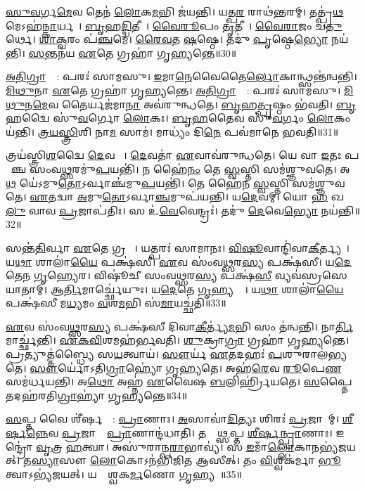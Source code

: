 \ul{𑌸𑍁}\ul{𑌵}𑌰𑍍𑌗\ul{𑌮𑍇}𑌵 𑌤𑍇𑌨॑ \ul{𑌲𑍋}𑌕\ul{𑌮}𑌭𑌿 𑌜॑𑌯𑌨𑍍𑌤𑌿।
𑌯𑌤𑍍𑌪\ul{𑌰}\ul{} 𑌰𑌾𑌥॑𑌨𑍍𑌤𑌰𑌮𑍍।
𑌤𑌤𑍍𑌪𑍍𑌰॑\ul{𑌥}𑌮𑍇\-𑌽𑌹॑\ul{𑌨𑍍𑌕𑌾}𑌰𑍍𑌯𑌮𑍍᳚।
\ul{𑌬𑍃}𑌹\ul{𑌦𑍍𑌦𑍍𑌵𑌿}𑌤𑍀𑌯𑍇᳚।
\ul{𑌵𑍈}\ul{𑌰𑍂}𑌪𑌂 \ul{𑌤𑍃}𑌤𑍀𑌯𑍇᳚।
\ul{𑌵𑍈}\ul{𑌰𑌾}𑌜𑌂 𑌚॑\ul{𑌤𑍁}𑌰𑍍𑌥𑍇।
\ul{𑌶𑌾}\ul{𑌕𑍍𑌵}𑌰𑌂 𑌪॑\ul{𑌞𑍍𑌚}𑌮𑍇।
\ul{𑌰𑍈}\ul{𑌵}𑌤 \ul{𑌷}𑌷𑍍𑌠𑍇।
𑌤𑌦𑍁॑ \ul{𑌪𑍃}𑌷𑍍𑌠𑍇\ul{𑌭𑍍𑌯𑍋} 𑌨𑌯॑𑌨𑍍𑌤𑌿।
\ul{𑌸}𑌨𑍍𑌤𑌨॑𑌯 \ul{𑌏}𑌤𑍇 𑌗𑍍𑌰𑌹𑌾॑ 𑌗𑍃𑌹𑍍𑌯𑌨𑍍𑌤𑍇॥30॥

\ul{𑌅}\ul{𑌤𑌿}\ul{𑌗𑍍𑌰𑌾}𑌹𑍍𑌯𑌾᳚: 𑌪𑌰𑌃॑ 𑌸𑌾𑌮𑌸𑍁।
\ul{𑌇}𑌮𑌾\ul{𑌨𑍇}𑌵𑍈𑌤𑍈\ul{𑌰𑍍𑌲𑍋}𑌕𑌾𑌨𑍍𑌥𑍍𑌸𑌨𑍍𑌤॑𑌨𑍍𑌵𑌨𑍍𑌤𑌿।
\ul{𑌮𑌿}\ul{𑌥𑍁}𑌨𑌾 \ul{𑌏}𑌤𑍇 𑌗𑍍𑌰𑌹𑌾॑ 𑌗𑍃𑌹𑍍𑌯𑌨𑍍𑌤𑍇।
\ul{𑌅}\ul{𑌤𑌿}\ul{𑌗𑍍𑌰𑌾}𑌹𑍍𑌯𑌾᳚: 𑌪𑌰𑌃॑ 𑌸𑌾𑌮𑌸𑍁।
\ul{𑌮𑌿}\ul{𑌥𑍁}𑌨\ul{𑌮𑍇}𑌵 𑌤𑍈𑌰𑍍𑌯𑌜॑𑌮𑌾\ul{𑌨𑌾} 𑌅𑌵॑𑌰𑍁𑌨𑍍𑌧𑌤𑍇।
\ul{𑌬𑍃}𑌹\ul{𑌤𑍍𑌪𑍃}𑌷𑍍𑌠𑌂 𑌭॑𑌵𑌤𑌿।
\ul{𑌬𑍃}𑌹𑌦𑍍𑌵𑍈 𑌸𑍁॑\ul{𑌵}𑌰𑍍𑌗𑍋 \ul{𑌲𑍋}𑌕𑌃।
\ul{𑌬𑍃}\ul{𑌹}𑌤𑍈𑌵 𑌸𑍁॑\ul{𑌵}𑌰𑍍𑌗𑌂 \ul{𑌲𑍋}𑌕𑌂 𑌯॑𑌨𑍍𑌤𑌿।
\ul{𑌤𑍍𑌰}\ul{𑌯}\ul{𑌸𑍍𑌤𑍍𑌰𑌿}\ul{}𑌶𑌿  𑌨𑌾\ul{𑌮} 𑌸𑌾𑌮॑।
𑌮𑌾𑌧𑍍𑌯𑌂॑ 𑌦𑌿\ul{𑌨𑍇} 𑌪𑌵॑𑌮𑌾𑌨𑍇 𑌭𑌵𑌤𑌿॥31॥

𑌤𑍍𑌰𑌯॑𑌸𑍍𑌤𑍍𑌰𑌿\ul{𑌶}𑌦𑍍𑌵𑍈 \ul{𑌦𑍇}𑌵𑌤𑌾𑌃᳚।
\ul{𑌦𑍇}𑌵𑌤𑌾॑ \ul{𑌏}𑌵𑌾𑌵॑𑌰𑍁𑌨𑍍𑌧𑌤𑍇।
𑌯𑍇 𑌵𑌾 \ul{𑌇}𑌤𑌃 𑌪𑌰𑌾᳚𑌞𑍍𑌚 𑌸𑌂𑌵\ul{𑌥𑍍𑌸}𑌰𑌮𑍁॑\ul{𑌪}𑌯𑌨𑍍𑌤𑌿॑।
𑌨 𑌹𑍈॑\ul{𑌨𑌂} 𑌤𑍇 \ul{𑌸𑍍𑌵}𑌸𑍍𑌤𑌿 𑌸𑌮॑𑌶𑍍𑌞𑍁𑌵𑌤𑍇।
𑌅\ul{𑌥} 𑌯𑍇॑\-𑌽𑌮𑍁\ul{𑌤𑍋}\-𑌽𑌰𑍍𑌵𑌾𑌞𑍍𑌚॑𑌮𑍁\ul{𑌪}𑌯𑌨𑍍𑌤𑌿॑।
𑌤𑍇 𑌹𑍈॑𑌨 \ul{𑌸𑍍𑌵}𑌸𑍍𑌤𑌿 𑌸𑌮॑𑌶𑍍𑌞𑍁𑌵𑌤𑍇।
\ul{𑌏}𑌤𑌦𑍍𑌵𑌾 \ul{𑌅}𑌮𑍁\ul{𑌤𑍋}\-𑌽𑌰𑍍𑌵𑌾\ul{𑌞𑍍𑌚}𑌮𑍁𑌪॑𑌯𑌨𑍍𑌤𑌿।
𑌯\ul{𑌦𑍇}𑌵𑌮𑍍।
𑌯𑍋 \ul{𑌹} 𑌖\ul{𑌲𑍁} 𑌵𑌾𑌵 \ul{𑌪𑍍𑌰}𑌜𑌾𑌪॑𑌤𑌿𑌃।
𑌸 𑌉॑\ul{𑌵𑍇}𑌵𑍇𑌨𑍍𑌦𑍍𑌰𑌃॑।
𑌤𑌦𑍁॑ \ul{𑌦𑍇}𑌵𑍇\ul{𑌭𑍍𑌯𑍋} 𑌨𑌯॑𑌨𑍍𑌤𑌿॥32॥\anuvakamend[\ul{𑌕𑌾}𑌰𑍍𑌯𑌾॑ \ul{𑌵𑌿}𑌰𑌾𑌡𑍍𑌗𑍃॑𑌹𑍍𑌯\ul{𑌨𑍍𑌤𑍇} 𑌪𑌵॑𑌮𑌾𑌨𑍇 𑌭\ul{𑌵}𑌤𑍀\ul{𑌨𑍍𑌦𑍍𑌰} 𑌏𑌕𑌂॑ 𑌚]

𑌸𑌨𑍍𑌤॑\ul{𑌤𑌿}𑌰𑍍𑌵𑌾 \ul{𑌏}𑌤𑍇 𑌗𑍍𑌰𑌹𑌾𑌃᳚।
𑌯𑌤𑍍𑌪𑌰𑌃॑ 𑌸𑌾𑌮𑌾𑌨𑌃।
\ul{𑌵𑌿}\ul{𑌷𑍂}𑌵𑌾𑌨𑍍𑌦𑌿॑𑌵𑌾\-\ul{𑌕𑍀}𑌰𑍍𑌤𑍍𑌯𑌮𑍍᳚।
𑌯\ul{𑌥𑌾} 𑌶𑌾𑌲𑌾॑\ul{𑌯𑍈} 𑌪𑌕𑍍𑌷॑𑌸𑍀।
\ul{𑌏}𑌵 𑌸𑌂॑𑌵\ul{𑌥𑍍𑌸}𑌰\ul{𑌸𑍍𑌯} 𑌪𑌕𑍍𑌷॑𑌸𑍀।
𑌯\ul{𑌦𑍇}𑌤𑍇𑌨 \ul{𑌗𑍃}𑌹𑍍𑌯𑍇𑌰\sn{}।
𑌵𑌿𑌷𑍂॑𑌚𑍀 𑌸𑌂𑌵\ul{𑌥𑍍𑌸}𑌰\ul{𑌸𑍍𑌯} 𑌪𑌕𑍍𑌷॑\ul{𑌸𑍀} 𑌵𑍍𑌯𑌵॑𑌸𑍍𑌰𑌸𑍇𑌯𑌾𑌤𑌾𑌮𑍍।
𑌆\ul{𑌰𑍍𑌤𑌿}𑌮𑌾𑌰𑍍𑌚𑍍𑌛𑍇॑𑌯𑍁𑌃।
𑌯\ul{𑌦𑍇}𑌤𑍇 \ul{𑌗𑍃}𑌹𑍍𑌯𑌨𑍍𑌤𑍇᳚।
𑌯\ul{𑌥𑌾} 𑌶𑌾𑌲𑌾॑\ul{𑌯𑍈} 𑌪𑌕𑍍𑌷॑𑌸𑍀 𑌮\ul{𑌧𑍍𑌯}𑌮𑌂 \ul{𑌵}\ul{}𑌶\ul{𑌮}𑌭𑌿 𑌸॑\ul{𑌮𑌾}𑌯𑌚𑍍𑌛॑𑌤𑌿॥33॥

\ul{𑌏}𑌵 𑌸𑌂॑𑌵\ul{𑌥𑍍𑌸}𑌰\ul{𑌸𑍍𑌯} 𑌪𑌕𑍍𑌷॑𑌸𑍀 𑌦𑌿𑌵𑌾\ul{𑌕𑍀}𑌰𑍍𑌤𑍍𑌯॑\ul{𑌮}𑌭𑌿 𑌸𑌂 𑌤॑𑌨𑍍𑌵𑌨𑍍𑌤𑌿।
𑌨𑌾\ul{𑌰𑍍𑌤𑌿}𑌮𑌾𑌰𑍍𑌚𑍍𑌛॑𑌨𑍍𑌤𑌿।
\ul{𑌏}\ul{𑌕}\ul{𑌵𑌿}\ul{}𑌶𑌮𑌹॑𑌰𑍍𑌭𑌵𑌤𑌿।
\ul{𑌶𑍁}𑌕𑍍𑌰𑌾\ul{𑌗𑍍𑌰𑌾} 𑌗𑍍𑌰𑌹𑌾॑ 𑌗𑍃𑌹𑍍𑌯𑌨𑍍𑌤𑍇।
𑌪𑍍𑌰𑌤𑍍𑌯𑍁𑌤𑍍𑌤॑𑌬𑍍𑌧𑍍𑌯𑍈 𑌸\ul{𑌯}𑌤𑍍𑌵𑌾𑌯॑।
\ul{𑌸𑍗}𑌰𑍍𑌯॑ \ul{𑌏}𑌤𑌦𑌹𑌃॑ \ul{𑌪}𑌶𑍁𑌰𑌾𑌲॑𑌭𑍍𑌯𑌤𑍇।
\ul{𑌸𑍗}𑌰𑍍𑌯𑍋॑\-𑌽𑌤𑌿\ul{𑌗𑍍𑌰𑌾}𑌹𑍍𑌯𑍋॑ 𑌗𑍃𑌹𑍍𑌯𑌤𑍇।
𑌅𑌹॑\ul{𑌰𑍇}𑌵 \ul{𑌰𑍂}𑌪𑍇\ul{𑌣} 𑌸𑌮॑𑌰𑍍𑌧𑌯𑌨𑍍𑌤𑌿।
𑌅\ul{𑌥𑍋} 𑌅𑌹𑍍𑌨॑ \ul{𑌏}𑌵𑍈𑌷 \ul{𑌬}𑌲𑌿𑌰𑍍\mbox{}𑌹𑍍𑌰𑌿॑𑌯𑌤𑍇।
\ul{𑌸}𑌪𑍍𑌤𑍈𑌤𑌦𑌹॑𑌰𑌤𑌿\ul{𑌗𑍍𑌰𑌾}𑌹𑍍𑌯𑌾॑ 𑌗𑍃𑌹𑍍𑌯𑌨𑍍𑌤𑍇॥34॥

\ul{𑌸}𑌪𑍍𑌤 𑌵𑍈 𑌶𑍀॑𑌰𑍍\mbox{}\ul{𑌷}𑌣𑍍𑌯𑌾᳚: \ul{𑌪𑍍𑌰𑌾}𑌣𑌾𑌃।
\ul{𑌅}𑌸𑌾𑌵𑌾॑\ul{𑌦𑌿}𑌤𑍍𑌯𑌃 𑌶𑌿𑌰𑌃॑ \ul{𑌪𑍍𑌰}𑌜𑌾𑌨𑌾᳚𑌮𑍍।
\ul{𑌶𑍀}\ul{𑌰𑍍}𑌷\ul{𑌨𑍍𑌨𑍇}𑌵 \ul{𑌪𑍍𑌰}𑌜𑌾𑌨𑌾𑌂᳚ \ul{𑌪𑍍𑌰𑌾}𑌣𑌾𑌨𑍍𑌦॑𑌧𑌾𑌤𑌿।
𑌤𑌸𑍍𑌮𑌾᳚\ul{𑌥𑍍𑌸}𑌪𑍍𑌤 \ul{𑌶𑍀}\ul{𑌰𑍍}𑌷\ul{𑌨𑍍𑌪𑍍𑌰𑌾}𑌣𑌾𑌃।
𑌇𑌨𑍍𑌦𑍍𑌰𑍋॑ \ul{𑌵𑍃}𑌤𑍍𑌰 \ul{𑌹}𑌤𑍍𑌵𑌾।
𑌅𑌸𑍁॑𑌰𑌾𑌨𑍍𑌪\ul{𑌰𑌾}𑌭𑌾𑌵𑍍𑌯॑।
𑌸 \ul{𑌇}𑌮𑌾𑌁\ul{𑌲𑍍𑌲𑍋}𑌕𑌾\ul{𑌨}𑌭𑍍𑌯॑𑌜𑌯𑌤𑍍।
𑌤\ul{𑌸𑍍𑌯𑌾}𑌸𑍗 \ul{𑌲𑍋}𑌕𑍋\-𑌽𑌨॑𑌭𑌿𑌜𑌿𑌤 𑌆𑌸𑍀𑌤𑍍।
𑌤𑌂 \ul{𑌵𑌿}𑌶𑍍𑌵𑌕॑𑌰𑍍𑌮𑌾 \ul{𑌭𑍂}𑌤𑍍𑌵𑌾\-𑌽𑌭𑍍𑌯॑𑌜𑌯𑌤𑍍।
𑌯𑌦𑍍𑌵𑍈᳚𑌶𑍍𑌵𑌕\ul{𑌰𑍍𑌮}𑌣𑍋 \ul{𑌗𑍃}𑌹𑍍𑌯𑌤𑍇᳚॥35॥

